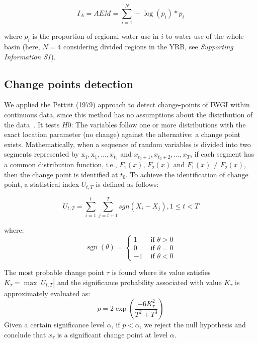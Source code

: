 	\begin{equation}
		I_A = AEM = \sum_{i=1}^N - \log(p_{i}) * p_{i}
	\end{equation}

	where $p_{i}$ is the proportion of regional water use in $i$ to water use of the whole basin (here, $N=4$ considering divided regions in the YRB, see \textit{Supporting Information S1}).

	\subsection{Change points detection}
		We applied the Pettitt (1979) approach to detect change-points of IWGI within continuous data, since this method has no assumptions about the distribution of the data~\cite{pettitt1979}.
		It tests $H0$: The variables follow one or more distributions with the exact location parameter (no change) against the alternative: a change point exists.
		Mathematically, when a sequence of random variables is divided into two segments represented by $\mathrm{x}_{1}, \mathrm{x}_{1}, \ldots, x_{t_{0}}$ and $x_{t_{0}+1}, x_{t_{0}+2}, \ldots, x_{T}$, if each segment has a common distribution function, i.e., $F_1(x)$, $F_2(x)$ and $F_1(x) \neq F_2(x)$, then the change point is identified at $t_0$. To achieve the identification of change point, a statistical index $U_{t,T}$ is defined as follows:

		\begin{equation}
			U_{t, T} = \sum_{i=1}^t\sum_{j=t+1}^T sgn(X_i - X_j), 1 \leq t < T
		\end{equation}

		where:
		\begin{equation}
			\operatorname{sgn}(\theta)= \begin{cases}1 & \text { if } \theta>0 \\ 0 & \text { if } \theta=0 \\ -1 & \text { if } \theta<0\end{cases}
		\end{equation}

		The most probable change point $\tau$ is found where its value satisfies $K_{\tau} = \max|U_{t, T}|$ and the significance probability associated with value $K_{\tau}$ is approximately evaluated as:
		\begin{equation}
			p=2 \exp \left(\frac{-6 K_{\tau}^{2}}{T^{2}+T^{3}}\right)
		\end{equation}
		Given a certain significance level $\alpha$, if $p < \alpha$, we reject the null hypothesis and conclude that $x_{\tau}$ is a significant change point at level $\alpha$.

